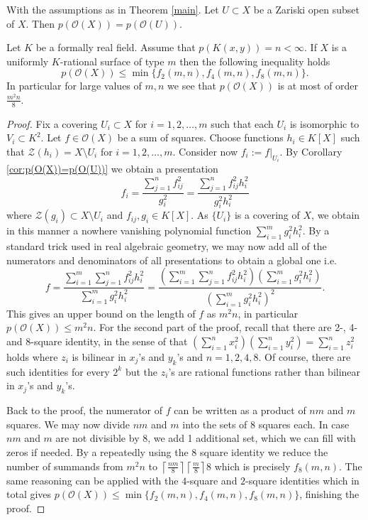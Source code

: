 \documentclass[10pt,a4paper]{amsart}
\newcommand{\OO}{\mathcal{O}}
\begin{document}
\begin{cor}\label{cor:p(O(X))=p(O(U))}
With the assumptions as in Theorem \ref{main}. Let  $U \subset X$ be a Zariski open subset of $X$. Then $p(\OO(X))=p(\OO(U))$.
\end{cor}

\begin{thm}
Let $K$ be a formally real field. Assume that $p(K(x,y))=n < \infty$. If $X$ is a uniformly $K$-rational surface of type $m$ then the following inequality holds
$$p(\OO(X)) \leq \min\{f_2(m,n),f_4(m,n),f_8(m,n) \}. $$
In particular for large values of $m,n$ we see that $p(\OO(X))$ is at most of order $\frac{m^2n}{8}$.
\end{thm}

\begin{proof}
Fix a covering $U_i \subset X$ for $i=1,2,\dots, m$ such that each $U_i$ is isomorphic to $V_i \subset K^2$. Let $f \in \OO(X)$ be a sum of squares. Choose functions $h_i \in K[X]$ such that $\mathcal{Z}(h_i)=X\setminus U_i$ for $i=1,2,\dots, m$. Consider now $f_i:=f|_{U_i}$. By Corollary \ref{cor:p(O(X))=p(O(U))} we obtain a presentation 
$$f_i=\frac{\sum_{j=1}^n f^2_{ij}}{g_i^2}=\frac{\sum_{j=1}^n f^2_{ij}h_i^2}{g_i^2h_i^2}$$
where $\mathcal{Z}(g_i) \subset X\setminus U_i$ and $f_{ij},g_i \in K[X]$. As $\{U_i\}$ is a covering of $X$, we obtain in this manner a nowhere vanishing polynomial function $\sum_{i=1}^mg_i^2h_i^2$. By a standard trick used in real algebraic geometry, we may now add all of the numerators and denominators of all presentations to obtain a global one i.e.
$$f=\frac{\sum_{i=1}^m \sum_{j=1}^n f^2_{ij}h_i^2}{\sum_{i=1}^mg_i^2h_i^2}=\frac{\left(\sum_{i=1}^m \sum_{j=1}^n f^2_{ij}h_i^2\right)\left(\sum_{i=1}^mg_i^2h_i^2\right)}{\left(\sum_{i=1}^mg_i^2h_i^2\right)^2}.$$
This gives an upper bound on the length of $f$ as $m^2n$, in particular $p(\OO(X)) \leq m^2n$.
For the second part of the proof, recall that there are 2-, 4- and 8-square identity, in the sense of that
$(\sum_{i=1}^n x_i^2)(\sum_{i=1}^n y_i^2)=\sum_{i=1}^n z_i^2$
holds where $z_i$ is bilinear in $x_j$'s and $y_k$'s and $n=1,2,4,8$. Of course, there are such identities for every $2^k$ but the $z_i$'s are rational functions rather than bilinear in $x_j$'s and $y_k$'s.




Back to the proof, the numerator of $f$ can be written as a product of $nm$ and $m$ squares. We may now divide $nm$ and $m$ into the sets of $8$ squares each. In case $nm$ and $m$ are not divisible by $8$, we add 1 additional set, which we can fill with zeros if needed. By a repeatedly using the $8$ square identity we reduce the number of summands from $m^2n$ to $ \left\lceil\frac{nm}{8} \right\rceil \left\lceil\frac{m}{8}\right\rceil8 $ which is precisely $f_8(m,n)$. The same reasoning can be applied with the $4$-square and $2$-square identities which in total gives $p(\OO(X)) \leq \min\{f_2(m,n),f_4(m,n),f_8(m,n) \}$, finishing the proof.


\end{proof}
\end{document}
